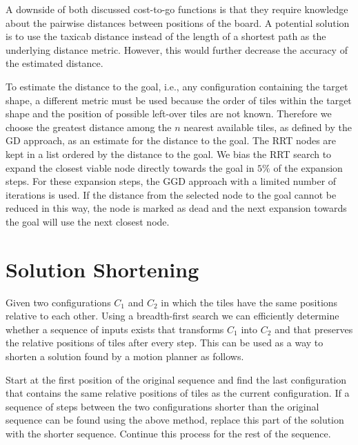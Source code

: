 A downside of both discussed cost-to-go functions is that they require knowledge about the pairwise distances between positions of the board. A potential solution is to use the taxicab distance instead of the length of a shortest path as the underlying distance metric. However, this would further decrease the accuracy of the estimated distance. \par

To estimate the distance to the goal, i.e., any configuration containing the target shape, a different metric must be used because the order of tiles within the target shape and the position of possible left-over tiles are not known. Therefore we choose the greatest distance among the $n$ nearest available tiles, as defined by the GD approach, as an estimate for the distance to the goal. The RRT nodes are kept in a list ordered by the distance to the goal. We bias the RRT search to expand the closest viable node directly towards the goal in $5\%$ of the expansion steps. For these expansion steps, the GGD approach with a limited number of iterations is used. If the distance from the selected node to the goal cannot be reduced in this way, the node is marked as dead and the next expansion towards the goal will use the next closest node. \par


\section {Solution Shortening}
Given two configurations $C_1$ and $C_2$ in which the tiles have the same positions relative to each other. Using a breadth-first search we can efficiently determine whether a sequence of inputs exists that transforms $C_1$ into $C_2$ and that preserves the relative positions of tiles after every step.
This can be used as a way to shorten a solution found by a motion planner as follows.\par
Start at the first position of the original sequence and find the last configuration that contains the same relative positions of tiles as the current configuration. If a sequence of steps between the two configurations shorter than the original sequence can be found using the above method, replace this part of the solution with the shorter sequence. Continue this process for the rest of the sequence.

